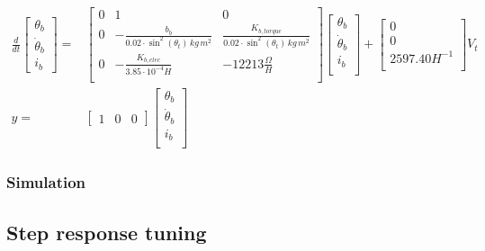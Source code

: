 \documentclass[../../main]{subfiles}
\begin{document}
\begin{equation}
      \label{eq:Theoretical_models_bottom}
      \begin{split}
      \frac{d}{dt}
          \begin{bmatrix}
              \theta_b        \\
              \dot \theta_b   \\
              i_b
          \end{bmatrix}
        =&
          \begin{bmatrix}
              0 & 1                         & 0                         \\
              0 & -\frac{b_b}{0.02\cdot \sin^2(\theta_t) \si{\,kg\,m^2}} & \frac{K_{b,torque}}{0.02\cdot \sin^2(\theta_t)\si{\,kg\,m^2}}  \\
              0 & -\frac{K_{b,elec}}{3.85\cdot 10^{-4}\si{H}}   & -12213 \si{\frac{\Omega}{H}}          \\
          \end{bmatrix}
    \begin{bmatrix}
        \theta_b        \\
        \dot \theta_b   \\
        i_b             \\
    \end{bmatrix}
        +
    \begin{bmatrix}
        0             \\
        0             \\
        2597.40 \si{H^{-1}} \\
    \end{bmatrix}
    V_t
\\
      y =&
    \begin{bmatrix}
        1 & 0 & 0
    \end{bmatrix}
    \begin{bmatrix}
        \theta_b \\
        \dot \theta_b\\
        i_b\\
    \end{bmatrix}
  \end{split}
\end{equation}


\subsubsection{Simulation}

\subsection{Step response tuning}
\label{ch:stepresponse_tuning}

\end{document}
